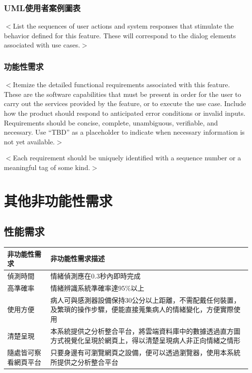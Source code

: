 \documentclass[12pt]{scrreprt}
\begin{document}

\subsection{UML使用者案例圖表}
$<$List the sequences of user actions and system responses that stimulate the 
behavior defined for this feature. These will correspond to the dialog elements 
associated with use cases.$>$

\subsection{功能性需求}
$<$Itemize the detailed functional requirements associated with this feature.  
These are the software capabilities that must be present in order for the user 
to carry out the services provided by the feature, or to execute the use case.  
Include how the product should respond to anticipated error conditions or 
invalid inputs. Requirements should be concise, complete, unambiguous, 
verifiable, and necessary. Use “TBD” as a placeholder to indicate when necessary 
information is not yet available.$>$

$<$Each requirement should be uniquely identified with a sequence number or a 
meaningful tag of some kind.$>$


\chapter{其他非功能性需求}

\section{性能需求}

\begin{center}  
\begin{tabular}{|l| p{10cm}|}  
\hline  
非功能性需求 & 非功能性需求描述   \\ \hline  
偵測時間 & 情緒偵測應在0.3秒內即時完成    \\ \hline  
高準確率 & 情緒辨識系統準確率達95\%以上 \\ \hline
使用方便 &病人可與感測器設備保持30公分以上距離，不需配戴任何裝置，及繁瑣的操作步驟，便能直接蒐集病人的情緒變化，方便實際使用 \\ \hline
清楚呈現 & 本系統提供之分析整合平台，將雲端資料庫中的數據透過直方圖方式視覺化呈現於網頁上，得以清楚呈現病人非正向情緒之情形 \\ \hline
隨處皆可察看網頁平台 & 只要身邊有可瀏覽網頁之設備，便可以透過瀏覽器，使用本系統所提供之分析整合平台 \\ \hline

\end{tabular}  
\end{center}  
\end{document}
